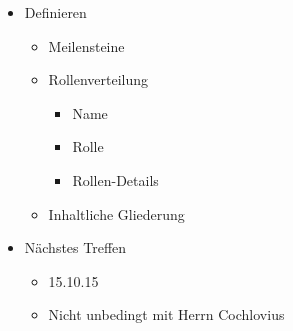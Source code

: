 \documentclass[a4paper,DIV=9,12pt]{scrreprt}
\begin{document}
\begin{itemize}
    \item Definieren
        \begin{itemize}
            \item Meilensteine
            \item Rollenverteilung
                \begin{itemize}
                    \item Name
                    \item Rolle
                    \item Rollen-Details
                \end{itemize}
            \item Inhaltliche Gliederung
        \end{itemize}

    \item Nächstes Treffen
        \begin{itemize}
            \item 15.10.15
            \item Nicht unbedingt mit Herrn Cochlovius
        \end{itemize}
\end{itemize}
\end{document}
